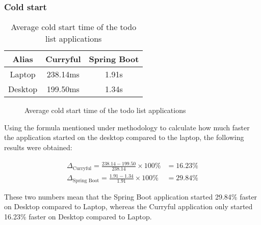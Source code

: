 \documentclass[a4paper,titlepage]{article}
\begin{document}
\subsubsection{Cold start}
\begin{table}[H]
	\begin{center}
		\begin{tabular}{|c|c|c|}
			\hline
			Alias   & Curryful & Spring Boot \\
			\hline
			Laptop  & 238.14ms & 1.91s       \\
			Desktop & 199.50ms & 1.34s       \\
			\hline
		\end{tabular}
		\caption{Average cold start time of the todo list applications}
		\label{table:cold-start-results}
	\end{center}
\end{table}

\begin{figure}[H]
	\centering
	\caption{Average cold start time of the todo list applications}
	\label{figure:cold-start-results}
\end{figure}

Using the formula mentioned under methodology to calculate how much faster the
application started on the desktop compared to the laptop, the following results
were obtained:

\begin{align*}
	\Delta_{\text{Curryful}} = \frac{238.14 - 199.50}{238.14} \times 100\% & = 16.23\% \\
	\Delta_{\text{Spring Boot}} = \frac{1.91 - 1.34}{1.91} \times 100\%    & = 29.84\%
\end{align*}

\noindent These two numbers mean that the Spring Boot application started
29.84\% faster on Desktop compared to Laptop, whereas the Curryful application
only started 16.23\% faster on Desktop compared to Laptop.
\end{document}
